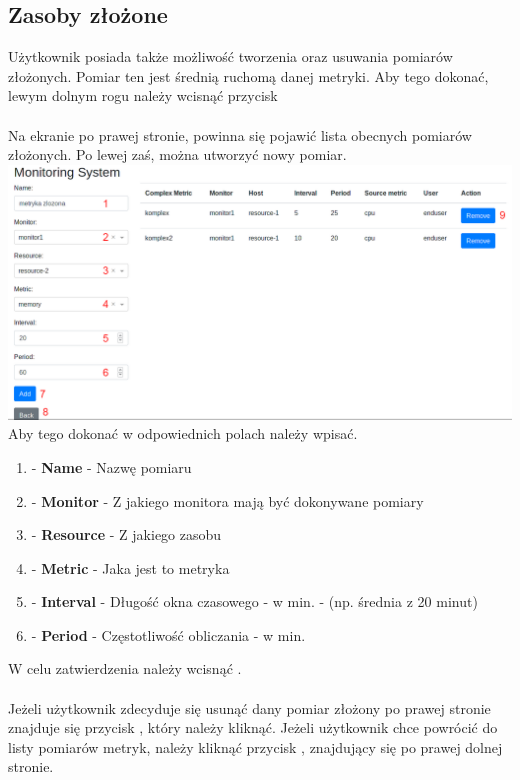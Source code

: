 \documentclass{article}
\begin{document}
\newpage
\subsection{Zasoby złożone}

Użytkownik posiada także możliwość tworzenia oraz usuwania pomiarów złożonych. Pomiar ten jest średnią ruchomą danej metryki. Aby tego dokonać, lewym dolnym rogu należy wcisnąć przycisk  \\\\
Na ekranie po prawej stronie, powinna się pojawić lista obecnych pomiarów złożonych. Po lewej zaś, można utworzyć nowy pomiar.\\
\includegraphics[width=\linewidth]{../screen/ComplexSystem2.png}
 Aby tego dokonać w odpowiednich polach należy wpisać.\\
\begin{enumerate}
\item - \textbf{Name} - Nazwę pomiaru
\item - \textbf{Monitor} - Z jakiego monitora mają być dokonywane pomiary
\item - \textbf{Resource} - Z jakiego zasobu  
\item - \textbf{Metric} - Jaka jest to metryka
\item - \textbf{Interval} - Długość okna czasowego - w min. - (np. średnia z 20 minut)
\item - \textbf{Period} - Częstotliwość obliczania - w min.
\end{enumerate}
W celu zatwierdzenia należy wcisnąć  .\\\\ 
Jeżeli użytkownik zdecyduje się usunąć dany pomiar złożony po prawej stronie znajduje się przycisk  , który należy kliknąć. Jeżeli użytkownik chce powrócić do listy pomiarów metryk, należy kliknąć przycisk  , znajdujący się po prawej dolnej stronie.
\end{document}

